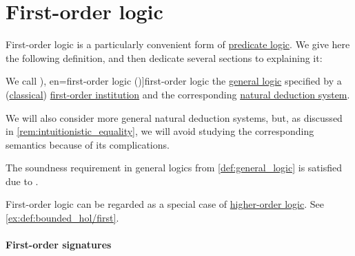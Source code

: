 \section{First-order logic}\label{sec:first_order_logic}

First-order logic is a particularly convenient form of \hyperref[con:predicate_logic]{predicate logic}. We give here the following definition, and then dedicate several sections to explaining it:
\begin{definition}\label{def:first_order_logic}\mimprovised
  We call \term[ru=логика первого порядка (\cite[83]{Герасимов2014Вычислимость}), en=first-order logic (\cite[58]{VanDalen2004LogicAndStructure})]{first-order logic} the \hyperref[def:general_logic]{general logic} specified by a (\hyperref[def:truth_value_algebra/classical]{classical}) \hyperref[def:fol_institution]{first-order institution} and the corresponding \hyperref[def:fol_natural_deduction]{natural deduction system}.

  We will also consider more general natural deduction systems, but, as discussed in \cref{rem:intuitionistic_equality}, we will avoid studying the corresponding semantics because of its complications.
\end{definition}
\begin{comments}
  \item The soundness requirement in general logics from \cref{def:general_logic} is satisfied due to .

  \item First-order logic can be regarded as a special case of \hyperref[def:higher_order_logic]{higher-order logic}. See \cref{ex:def:bounded_hol/first}.
\end{comments}

\paragraph{First-order signatures}

